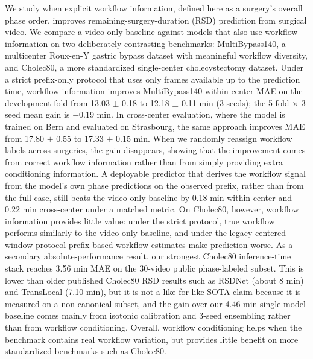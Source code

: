 We study when explicit workflow information, defined here as a surgery's
overall phase order, improves remaining-surgery-duration (RSD)
prediction from surgical video. We compare a video-only baseline against
models that also use workflow information on two deliberately
contrasting benchmarks: MultiBypass140, a multicenter Roux-en-Y gastric
bypass dataset with meaningful workflow diversity, and Cholec80, a more
standardized single-center cholecystectomy dataset. Under a strict
prefix-only protocol that uses only frames available up to the
prediction time, workflow information improves MultiBypass140
within-center MAE on the development fold from 13.03 $\pm$ 0.18 to 12.18 $\pm$
0.11 min (3 seeds); the 5-fold $\times$ 3-seed mean gain is $-$0.19 min. In
cross-center evaluation, where the model is trained on Bern and
evaluated on Strasbourg, the same approach improves MAE from 17.80 $\pm$
0.55 to 17.33 $\pm$ 0.15 min. When we randomly reassign workflow labels
across surgeries, the gain disappears, showing that the improvement
comes from correct workflow information rather than from simply
providing extra conditioning information. A deployable predictor that
derives the workflow signal from the model's own phase predictions on
the observed prefix, rather than from the full case, still beats the
video-only baseline by 0.18 min within-center and 0.22 min cross-center
under a matched metric. On Cholec80, however, workflow information
provides little value: under the strict protocol, true workflow performs
similarly to the video-only baseline, and under the legacy
centered-window protocol prefix-based workflow estimates make prediction
worse. As a secondary absolute-performance result, our strongest
Cholec80 inference-time stack reaches 3.56 min MAE on the 30-video
public phase-labeled subset. This is lower than older published Cholec80
RSD results such as RSDNet (about 8 min) and TransLocal (7.10 min), but
it is not a like-for-like SOTA claim because it is measured on a
non-canonical subset, and the gain over our 4.46 min single-model
baseline comes mainly from isotonic calibration and 3-seed ensembling
rather than from workflow conditioning. Overall, workflow conditioning
helps when the benchmark contains real workflow variation, but provides
little benefit on more standardized benchmarks such as Cholec80.